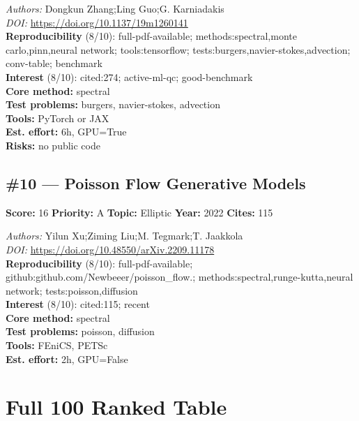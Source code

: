 \documentclass[10pt,letterpaper]{article}
\begin{document}
\textit{Authors:} Dongkun Zhang;Ling Guo;G. Karniadakis \\ 
\textit{DOI:} \url{https://doi.org/10.1137/19m1260141} \\ 
\textbf{Reproducibility } (8/10): full-pdf-available; methods:spectral,monte carlo,pinn,neural network; tools:tensorflow; tests:burgers,navier-stokes,advection; conv-table; benchmark \\ 
\textbf{Interest } (8/10): cited:274; active-ml-qc; good-benchmark \\ 
\textbf{Core method:} spectral \\ 
\textbf{Test problems:} burgers, navier-stokes, advection \\ 
\textbf{Tools:} PyTorch or JAX \\ 
\textbf{Est. effort:} 6h, GPU=True \\ 
\textbf{Risks:} no public code \\ 

\subsection*{\#10 — Poisson Flow Generative Models}
\textbf{Score:} 16 \quad \textbf{Priority:} A \quad \textbf{Topic:} Elliptic \quad \textbf{Year:} 2022 \quad \textbf{Cites:} 115

\textit{Authors:} Yilun Xu;Ziming Liu;M. Tegmark;T. Jaakkola \\ 
\textit{DOI:} \url{https://doi.org/10.48550/arXiv.2209.11178} \\ 
\textbf{Reproducibility } (8/10): full-pdf-available; github:github.com/Newbeeer/poisson\_flow.; methods:spectral,runge-kutta,neural network; tests:poisson,diffusion \\ 
\textbf{Interest } (8/10): cited:115; recent \\ 
\textbf{Core method:} spectral \\ 
\textbf{Test problems:} poisson, diffusion \\ 
\textbf{Tools:} FEniCS, PETSc \\ 
\textbf{Est. effort:} 2h, GPU=False \\ 


\section{Full 100 Ranked Table}
\end{document}
